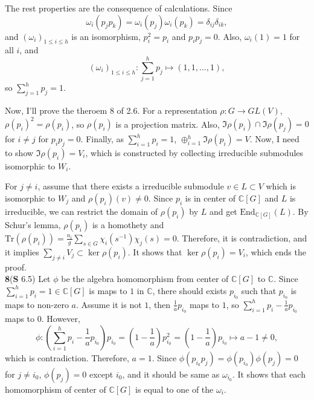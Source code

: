 \documentclass[a4paper, 12pt]{article}
\theoremstyle{Mydefinition}
\theoremstyle{Mytheorem}
\begin{document}
The rest properties are the consequence of calculations. Since 
\begin{equation}
    \omega_i(p_jp_k) = \omega_i(p_j)\omega_i(p_k)=\delta_{ij}\delta_{ik},
\end{equation}
and $(\omega_i)_{1\leq i\leq h}$ is an isomorphism, $p_i^2 = p_i$ and $p_ip_j = 0$. Also, $\omega_i(1) = 1$ for all $i$, and
\begin{equation}
    (\omega_i)_{1\leq i\leq h}:\sum_{j=1}^h p_j\mapsto (1,1,\ldots, 1),
\end{equation}
so $\sum_{j=1}^h p_j = 1$.

Now, I'll prove the theroem 8 of 2.6. For a representation $\rho:G\rightarrow GL(V)$, $\rho(p_i)^2 = \rho(p_i)$, so $\rho(p_i)$ is a projection matrix. Also, $\Im \rho(p_i)\cap \Im \rho(p_j) = 0$ for $i\neq j$ for $p_ip_j = 0$. Finally, as $\sum_{i=1}^h p_i = 1$, $\oplus_{i=1}^h \Im \rho(p_i) = V$. Now, I need to show $\Im\rho(p_i) = V_i$, which is constructed by collecting irreducible submodules isomorphic to $W_i$.

For $j\neq i$, assume that there exists a irreducible submodule $v\in L\subset V$ which is isomorphic to $W_j$ and $\rho(p_i)(v)\neq 0$. Since $p_i$ is in center of $\mathbb{C}[G]$ and $L$ is irreducible, we can restrict the domain of $\rho(p_i)$ by $L$ and get $\mathrm{End}_{\mathbb{C}[G]}(L)$. By Schur's lemma, $\rho(p_i)$ is a homothety and $\mathrm{Tr}(\rho(p_i)) = \frac{n_i}{g}\sum_{s\in G}\chi_i(s^{-1})\chi_j(s) = 0$. Therefore, it is contradiction, and it implies $\sum_{j\neq i} V_j\subset \ker \rho(p_i)$. It shows that $\ker \rho(p_i) = V_i$, which ends the proof.\\

\noindent \textbf{8}(\textbf{S} 6.5)
Let $\phi$ be the algebra homomorphism from center of $\mathbb{C}[G]$ to $\mathbb{C}$. Since $\sum_{i=1}^h p_i = 1\in \mathbb{C}[G]$ is maps to $1$ in $\mathbb{C}$, there should exists $p_{i_0}$ such that $p_{i_0}$ is maps to non-zero $a$. Assume it is not $1$, then $\frac{1}{a}p_{i_0}$ maps to $1$, so $\sum_{i=1}^h p_i - \frac{1}{a}p_{i_0}$ maps to $0$. However,
\begin{equation}
    \phi:\left(\sum_{i=1}^h p_i - \frac{1}{a}p_{i_0}\right)p_{i_0} = \left(1-\frac{1}{a}\right)p_{i_0}^2 = \left(1-\frac{1}{a}\right)p_{i_0}\mapsto a-1\neq 0,
\end{equation}
which is contradiction. Therefore, $a=1$. Since $\phi(p_{i_0}p_j) = \phi(p_{i_0})\phi(p_j)=0$ for $j\neq i_0$, $\phi(p_j) = 0$ except $i_0$, and it should be same as $\omega_{i_0}$. It shows that each homomorphism of center of $\mathbb{C}[G]$ is equal to one of the $\omega_i$.\\
\end{document}
